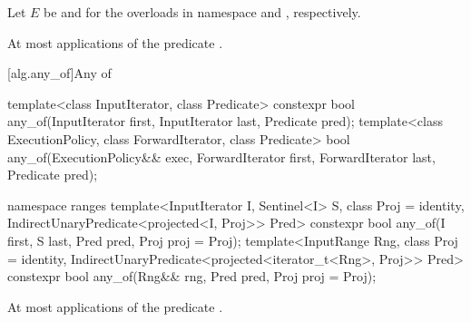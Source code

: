 \begin{itemdescr}
\begin{addedblock}
\pnum
Let $E$ be  and 
for the overloads in namespace  and , respectively.
\end{addedblock}

\pnum
{}


\pnum
\complexity At most  applications of the predicate
.
\end{itemdescr}

[alg.any_of]{Any of}

%
\begin{itemdecl}
template<class InputIterator, class Predicate>
  constexpr bool any_of(InputIterator first, InputIterator last, Predicate pred);
template<class ExecutionPolicy, class ForwardIterator, class Predicate>
  bool any_of(ExecutionPolicy&& exec, ForwardIterator first, ForwardIterator last,
              Predicate pred);
\end{itemdecl}\begin{addedblock}\begin{itemdecl}
namespace ranges {
  template<InputIterator I, Sentinel<I> S, class Proj = identity,
      IndirectUnaryPredicate<projected<I, Proj>> Pred>
    constexpr bool any_of(I first, S last, Pred pred, Proj proj = Proj{});
  template<InputRange Rng, class Proj = identity,
      IndirectUnaryPredicate<projected<iterator_t<Rng>, Proj>> Pred>
    constexpr bool any_of(Rng&& rng, Pred pred, Proj proj = Proj{});
}
\end{itemdecl}
\end{addedblock}

\begin{itemdescr}
\pnum
{}

\pnum
{}


\pnum
\complexity At most  applications of the predicate
.
\end{itemdescr}

